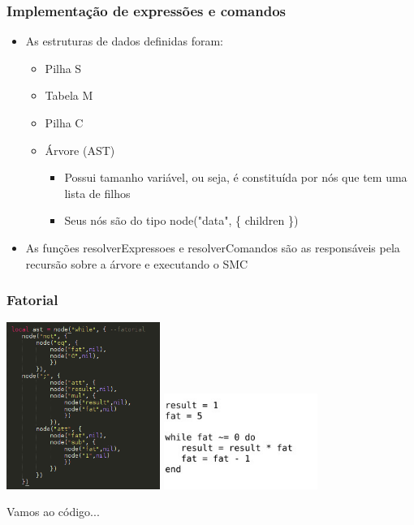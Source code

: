 \documentclass{beamer}
\begin{document}
\begin{frame}
    \frametitle{Implementação de expressões e comandos}
    \begin{itemize}
        \item As estruturas de dados definidas foram:
        \begin{itemize}
            \item Pilha S
            \item Tabela M
            \item Pilha C
            \item Árvore (AST) 
            \begin{itemize}
                \item Possui tamanho variável, ou seja, é constituída por nós que tem uma lista de filhos
                \item Seus nós são do tipo node("data", \{ children \})
            \end{itemize}
        \end{itemize}
        \item As funções resolverExpressoes e resolverComandos são as responsáveis pela recursão sobre a árvore e executando o SMC
    \end{itemize}
\end{frame}


\begin{frame}
    \frametitle{Fatorial}
    \includegraphics[width=5cm]{images/ast_fatorial.png}
    \centering\includegraphics[width=5cm]{images/fatorial_normal.jpg}
\end{frame}

\begin{frame}
    Vamos ao código...
\end{frame}
\end{document}
